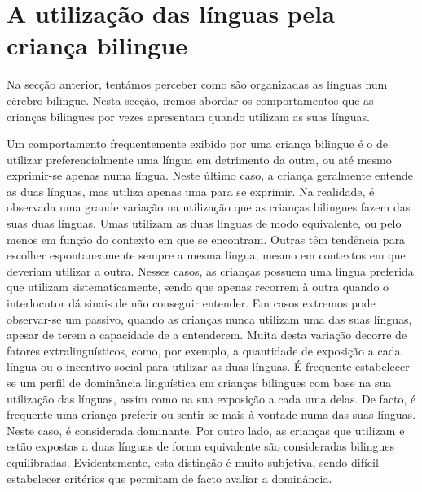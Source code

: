 \documentclass[output=paper]{LSP/langsci}
\begin{document}
\section{A utilização das línguas pela criança bilingue}%
\label{sec:almeida_utilizacao}

Na secção anterior, tentámos perceber como são organizadas as línguas num cérebro bilingue. Nesta secção, iremos abordar os comportamentos que as crianças bilingues por vezes apresentam quando utilizam as suas línguas.

Um comportamento frequentemente exibido por uma criança bilingue é o de utilizar preferencialmente uma língua em detrimento da outra, ou até mesmo exprimir-se apenas numa língua. Neste último caso, a criança geralmente entende as duas línguas, mas utiliza apenas uma para se exprimir. Na realidade, é observada uma grande variação na utilização que as crianças bilingues fazem das suas duas línguas. Umas utilizam as duas línguas de modo equivalente, ou pelo menos em função do contexto em que se encontram. Outras têm tendência para escolher espontaneamente sempre a mesma língua, mesmo em contextos em que deveriam utilizar a outra. Nesses casos, as crianças possuem uma língua preferida que utilizam sistematicamente, sendo que apenas recorrem à outra quando o interlocutor dá sinais de não conseguir entender. Em casos extremos pode observar-se um  passivo, quando as crianças nunca utilizam uma das suas línguas, apesar de terem a capacidade de a entenderem. Muita desta variação decorre de fatores extralinguísticos, como, por exemplo, a quantidade de exposição a cada língua ou o incentivo social para utilizar as duas línguas. É frequente estabelecer-se um perfil de dominância linguística em crianças bilingues com base na sua utilização das línguas, assim como na sua exposição a cada uma delas. De facto, é frequente uma criança preferir ou sentir-se mais à vontade numa das suas línguas. Neste caso, é considerada dominante. Por outro lado, as crianças que utilizam e estão expostas a duas línguas de forma equivalente são consideradas bilingues equilibradas. Evidentemente, esta distinção é muito subjetiva, sendo difícil estabelecer critérios que permitam de facto avaliar a dominância. 
\end{document}
